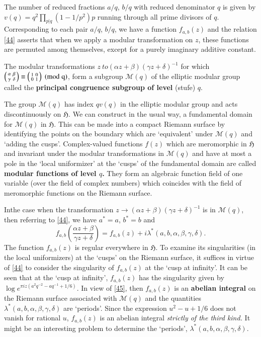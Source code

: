 The number of reduced fractions $a/q$, $b/q$ with reduced denominator
$q$ is given by $v(q)=q^{2}\prod\limits_{p|q}(1-1/p^{2})p$ running
through all prime divisors of $q$. Corresponding to each pair $a/q$,
$b/q$, we have a function $f_{a,b}(z)$ and the relation \eqref{44}
asserts that when we apply a modular transformation on $z$, these
functions are permuted among themselves, except for a purely imaginary
additive constant.

The modular transformations $z\ to (\alpha z +\beta)(\gamma
z+\delta)^{-1}$ for which $\left(\begin{smallmatrix} \alpha & \beta\\ \gamma
  & \delta \end{smallmatrix} \right)\equiv \left(\begin{smallmatrix} 1 & 0 \\ 0 & 1
\end{smallmatrix} \right) \; (\rm{mod} \;  q)$, form a subgroup
$\mathscr{M}(q)$ of the elliptic modular group called the {\bf
  principal congruence subgroup   of level} (stufe) $q$. 

The group $\mathscr{M}(q)$ has index $qv(q)$ in the elliptic modular
group and acts discontinuously on $\mathfrak{H}$. We can construct in
the usual way, a fundamental domain for $\mathscr{M}(q)$ in
$\mathfrak{H}$. This can be made into a compact Riemann surface by
identifying the points on the boundary which are `equivalent' under
$\mathscr{M}(q)$ and `adding the cusps'. Complex-valued functions
$f(z)$ which are meromorphic in $\mathfrak{H}$ and invariant under the
modular transformations in $\mathscr{M}(q)$ and have at most a pole in
the `local uniformizer' at the `cusps' of the fundamental domain are
called {\bf modular functions of level $q$.} They form an algebraic
function field of one variable (over the field of complex numbers)
which coincides with the field of meromorphic functions on the Riemann
surface. 

In\pageoriginale the case when the transformation $z\to(\alpha
z+\beta)(\gamma z+\delta)^{-1}$ is in $\mathscr{M}(q)$, then referring
to \eqref{44}, we have $a^{\ast}=a$, $b^{\ast}=b$ and
\begin{equation*}
f_{a,b}\left(\frac{\alpha z+\beta}{\gamma z+\delta}\right)=f_{a,b}(z)+i\lambda^{\ast}(a,b,\alpha,\beta,\gamma,\delta).\tag{45}\label{45}
\end{equation*}
The function $f_{a,b}(z)$ is regular everywhere in $\mathfrak{H}$. To
examine its singularities (in the local uniformizers) at the `cusps'
on the Riemann surface, it suffices in virtue of \eqref{44} to
consider the singularity of $f_{a,b}(z)$ at the `cusp at infinity'. It
can be seen that at the `cusp at infinity', $f_{a,b}(z)$ has the
singularity given by $\log e^{\pi iz(a^{2}q^{-2}-aq^{-1}+1/6)}$. In
view of \eqref{45}, then $f_{a,b}(z)$ is an {\bf abelian integral} on
the Riemann surface associated with $\mathscr{M}(q)$ and the
quantities $\lambda^{\ast}(a,b,\alpha,\beta,\gamma,\delta)$ are
`periods'. Since the expression $u^{2}-u+1/6$ does not vanish for
rational $u$, $f_{a,b}(z)$ is an abelian integral {\em strictly of the
  third kind.} It might be an interesting problem to determine the
`periods', $\lambda^{\ast}(a,b,\alpha,\beta,\gamma,\delta)$.

